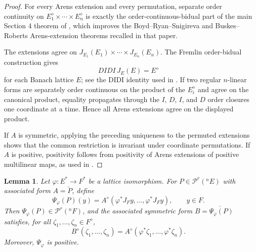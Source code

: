 \documentclass[11pt]{amsart}
\newtheorem{lemma}[theorem]{Lemma}
\newcommand{\Prg}{\mathcal P^r}
\begin{document}
\begin{proof}
For every Arens extension and every permutation, separate order continuity on
$E_1^\diamond\times\cdots\times E_n^\diamond$ is exactly the
order-continuous-bidual part of the main Section 4 theorem of
\cite{BotelhoGarcia2022}, which improves the Boyd--Ryan--Snigireva and
Buskes--Roberts Arens-extension theorems recalled in that paper.

The extensions agree on $J_{E_1}(E_1)\times\cdots\times J_{E_n}(E_n)$.  The
Fremlin order-bidual construction gives
\[
        DIDI\,J_E(E)=E^\diamond
\]
for each Banach lattice $E$; see the DIDI identity used in
\cite{BuskesRoberts2019}.  If two regular $n$-linear forms are
separately order continuous on the product of the $E_i^\diamond$ and agree on
the canonical product, equality propagates through the $I$, $D$, $I$, and $D$
order closures one coordinate at a time.  Hence all Arens extensions agree on
the displayed product.

If $A$ is symmetric, applying the preceding uniqueness to the permuted
extensions shows that the common restriction is invariant under coordinate
permutations.  If $A$ is positive, positivity follows from positivity of
Arens extensions of positive multilinear maps, as used in
\cite[Theorem 2.2(c)]{BotelhoGarcia2022}.
\end{proof}

\begin{lemma}\label{lem:transfer}
Let $\varphi:E^*\to F^*$ be a lattice isomorphism.  For
$P\in\Prg({}^nE)$ with associated form $A=\check P$, define
\[
        \Psi_\varphi(P)(y)
        =A^\diamond(\varphi^*J_Fy,\ldots,\varphi^*J_Fy),\qquad y\in F .
\]
Then $\Psi_\varphi(P)\in\Prg({}^nF)$, and the associated symmetric form
$B=\check{\Psi_\varphi(P)}$ satisfies, for all
$\zeta_1,\ldots,\zeta_n\in F^\diamond$,
\[
        B^\diamond(\zeta_1,\ldots,\zeta_n)
        =
        A^\diamond(\varphi^*\zeta_1,\ldots,\varphi^*\zeta_n).
        \tag{1}\label{eq:functoriality}
\]
Moreover, $\Psi_\varphi$ is positive.
\end{lemma}
\end{document}

